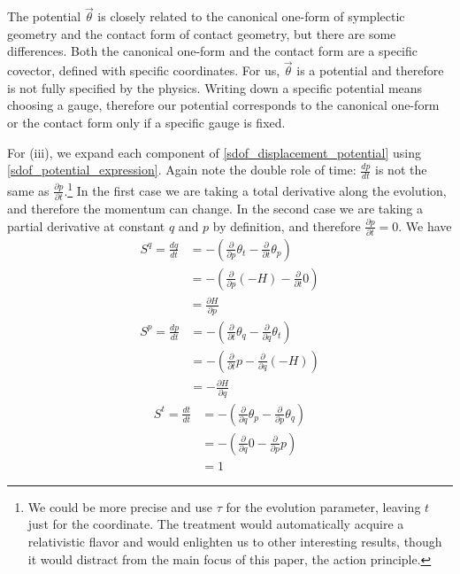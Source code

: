 \documentclass[fleqn,10pt]{wlscirep}
\begin{document}
The potential $\vec{\theta}$ is closely related to the canonical one-form of symplectic geometry and the contact form of contact geometry, but there are some differences. Both the canonical one-form and the contact form are a specific covector, defined with specific coordinates. For us, $\vec{\theta}$ is a potential and therefore is not fully specified by the physics. Writing down a specific potential means choosing a gauge, therefore our potential corresponds to the canonical one-form or the contact form only if a specific gauge is fixed.

For (iii), we expand each component of \ref{sdof_displacement_potential} using \ref{sdof_potential_expression}. Again note the double role of time: $\frac{dp}{dt}$ is not the same as $\frac{\partial p}{\partial t}$.\footnote{We could be more precise and use $\tau$ for the evolution parameter, leaving $t$ just for the coordinate. The treatment would automatically acquire a relativistic flavor and would enlighten us to other interesting results, though it would distract from the main focus of this paper, the action principle. } In the first case we are taking a total derivative along the evolution, and therefore the momentum can change. In the second case we are taking a partial derivative at constant $q$ and $p$ by definition, and therefore $\frac{\partial p}{\partial t}=0$. We have
\begin{equation}
\begin{aligned}
	S^q = \frac{dq}{dt}
	&= - \left( \frac{\partial}{\partial p} \theta_t - \frac{\partial}{\partial t} \theta_p \right) \\
	&= - \left( \frac{\partial}{\partial p} (-H) - \frac{\partial}{\partial t} 0 \right) \\
	& = \frac{\partial H}{\partial p}
\end{aligned}
\end{equation}
\begin{equation}
\begin{aligned}
	S^p = \frac{dp}{dt}
	&= - \left( \frac{\partial}{\partial t} \theta_q - \frac{\partial}{\partial q} \theta_t \right) \\
	&= - \left( \frac{\partial}{\partial t} p - \frac{\partial}{\partial q} (-H) \right) \\
	& = - \frac{\partial H}{\partial q}
\end{aligned}
\end{equation}
\begin{equation}
\begin{aligned}
	S^t = \frac{dt}{dt}
	&= - \left( \frac{\partial}{\partial q} \theta_p - \frac{\partial}{\partial p} \theta_q \right) \\
	&= - \left( \frac{\partial}{\partial q} 0 - \frac{\partial}{\partial p} p \right) \\
	& = 1
\end{aligned}
\end{equation}
\end{document}
